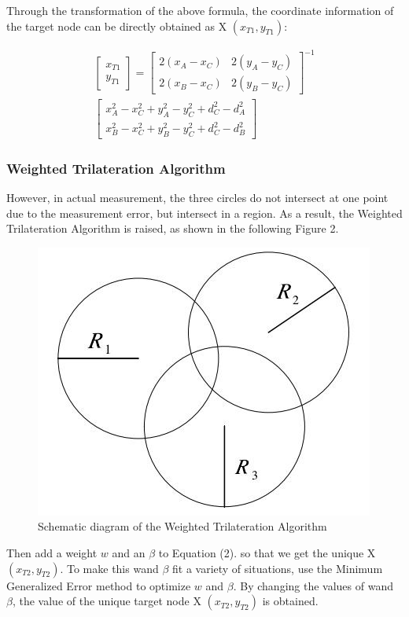 \documentclass{sigchi}
\begin{document}
Through the transformation of the above formula, the coordinate information of the target node can be directly obtained as X $(x_{T1}, y_{T1})$:

\begin{equation} \begin{split} \begin{bmatrix} x_{T1}\\ y_{T1} \end{bmatrix}=\begin{bmatrix} 2(x_{A} -x_{C}) & 2(y_{A} -y_{C})\\ 2(x_{B}-x_{C}) & 2(y_{B}-y_{C}) \end{bmatrix}^{-1}
\\
\begin{bmatrix} x^{2}_{A}-x^{2}_{C}+y_{A}^{2}-y_{C}^{2}+d^{2}_{C}-d^{2}_{A}\\ x^{2}_{B}-x^{2}_{C}+y_{B}^{2}-y_{C}^{2}+d^{2}_{C}-d^{2}_{B} \end{bmatrix} \end{split} \tag{3}  \end{equation}


\subsubsection{Weighted Trilateration Algorithm}
However, in actual measurement, the three circles do not intersect at one point due to the measurement error, but intersect in a region. As a result, the Weighted Trilateration Algorithm is raised, as shown in the following Figure 2. 

\begin{figure}[!h]
\centering
\includegraphics[width=0.6\columnwidth]{2}
\caption{Schematic diagram of the Weighted Trilateration Algorithm}
\label{fig:universe}
\end{figure}

Then add a weight $w$ and an $\beta$ to Equation (2). so that we get the unique X $(x_{T2}, y_{T2})$. To make this wand $\beta$ fit a variety of situations, use the Minimum Generalized Error method to optimize $w$ and $\beta$. By changing the values of wand $\beta$, the value of the unique target node X $(x_{T2}, y_{T2})$ is obtained.
\end{document}
